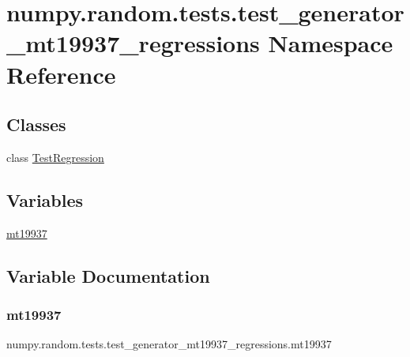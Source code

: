 \hypertarget{namespacenumpy_1_1random_1_1tests_1_1test__generator__mt19937__regressions}{}\section{numpy.\+random.\+tests.\+test\+\_\+generator\+\_\+mt19937\+\_\+regressions Namespace Reference}
\label{namespacenumpy_1_1random_1_1tests_1_1test__generator__mt19937__regressions}
\subsection*{Classes}
\begin{DoxyCompactItemize}
\item 
class \hyperlink{classnumpy_1_1random_1_1tests_1_1test__generator__mt19937__regressions_1_1TestRegression}{Test\+Regression}
\end{DoxyCompactItemize}
\subsection*{Variables}
\begin{DoxyCompactItemize}
\item 
\hyperlink{namespacenumpy_1_1random_1_1tests_1_1test__generator__mt19937__regressions_ab05ea35eb18f72b09a83696b398ff01e}{mt19937}
\end{DoxyCompactItemize}


\subsection{Variable Documentation}
\mbox{\label{namespacenumpy_1_1random_1_1tests_1_1test__generator__mt19937__regressions_ab05ea35eb18f72b09a83696b398ff01e}} 
\subsubsection{\texorpdfstring{mt19937}{mt19937}}
{\footnotesize\ttfamily numpy.\+random.\+tests.\+test\+\_\+generator\+\_\+mt19937\+\_\+regressions.\+mt19937}

